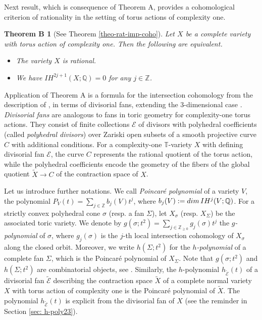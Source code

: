 \documentclass[11pt, reqno]{amsart}
\theoremstyle{plain}
\newtheorem*{thmB}{Theorem B}
\theoremstyle{definition}
\theoremstyle{remark}
\begin{document}
Next result, which is consequence of Theorem A, provides a cohomological criterion of rationality in the setting of torus actions of complexity one.  
\begin{thmB}[See Theorem \ref{theo-rat-imp-coho}]\label{TheoB-TheoB}
Let $X$ be a complete variety with torus action of complexity one. Then the following are equivalent.
\begin{itemize}
\item[$(1)$] The variety $X$ is rational.
\item[$(2)$] We have $IH^{2j+1}(X; \mathbb{Q})  = 0$  for any $j\in \mathbb{Z}$. 
\end{itemize}
\end{thmB}
Application of Theorem A is a  formula for
the intersection cohomology from the description of \cite{AIPSV12}, in terms of divisorial fans, extending the $3$-dimensional case \cite[Theorem 1.2]{AL21}.  \emph{Divisorial fans} are analogous to fans in toric geometry for complexity-one torus actions. They consist of finite collections $\mathscr{E}$ of divisors with polyhedral coefficients (called \emph{polyhedral divisors}) over Zariski open subsets of a smooth projective curve $C$ with additional conditions.  For a complexity-one $\mathbb{T}$-variety $X$ with defining divisorial fan $\mathscr{E}$,
the curve $C$ represents the rational quotient of the torus action, while the polyhedral coefficients encode the geometry of the fibers of the global quotient $\widetilde{X}\rightarrow C$ of the contraction space of $X$. 

Let us introduce further notations. We call \emph{Poincar\'e polynomial} of a variety $V$, the polynomial
$P_{V}(t) =  \sum_{j\in \mathbb{Z}}b_{j}(V)t^{j}$, where $b_{j}(V):= {\rm dim}\, IH^{j}(V; \mathbb{Q})$. For a strictly convex polyhedral cone $\sigma$ (resp. a fan $\Sigma$), let $X_{\sigma}$ (resp. $X_{\Sigma}$)
be the associated toric variety. We denote by
$g(\sigma; t^{2}) =  \sum_{j\in \mathbb{Z}_{\geq 0}}g_{j}(\sigma)t^{j}$ the \emph{$g$-polynomial} of $\sigma$, where $g_{j}(\sigma)$ is
the $j$-th local intersection cohomology of $X_{\sigma}$ along the closed orbit. Moreover, we write $h(\Sigma; t^{2})$ for 
the \emph{$h$-polynomial} of a  complete fan $\Sigma$, which is the Poincar\'e polynomial of $X_{\Sigma}$. Note that $g(\sigma; t^{2})$ and $h(\Sigma; t^{2})$ are combinatorial objects, see \cite{DL91, Fie91, BBFK02}. Similarly, the $h$-polynomial $h_{\widetilde{\mathscr{E}}}(t)$ of a divisorial fan $\widetilde{\mathscr{E}}$ describing
the contraction space $\widetilde{X}$ of a complete normal variety $X$ with torus action of complexity one is the Poincar\'e polynomial of $\widetilde{X}$. The polynomial $h_{\widetilde{\mathscr{E}}}(t)$ is explicit from the divisorial fan of $X$ (see the reminder in Section \ref{sec: h-poly23}).
\end{document}
